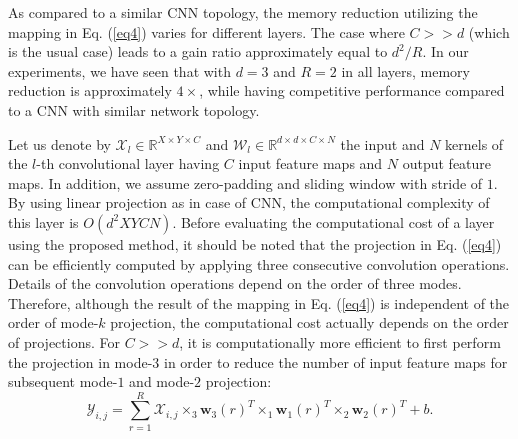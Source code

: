 \documentclass[conference,usletter]{IEEEtran}
\begin{document}
As compared to a similar CNN topology, the memory reduction utilizing the mapping in Eq. (\ref{eq4}) varies for different layers. The case where $C >> d$ (which is the usual case) leads to a gain ratio approximately equal to $d^2/R$. In our experiments, we have seen that with $d=3$ and $R=2$ in all layers, memory reduction is approximately $4\times$, while having competitive performance compared to a CNN with similar network topology.

Let us denote by $\mathcal{X}_l \in \mathbb{R}^{X\times Y\times C}$ and $\mathcal{W}_l \in \mathbb{R}^{d\times d\times C\times N}$ the input and $N$ kernels of the $l$-th convolutional layer having $C$ input feature maps and  $N$ output feature maps. In addition, we assume zero-padding and sliding window with stride of $1$. By using linear projection as in case of CNN, the computational complexity of this layer is $O(d^2XYCN)$. Before evaluating the computational cost of a layer using the proposed method, it should be noted that the projection in Eq. (\ref{eq4}) can be efficiently computed by applying three consecutive convolution operations. Details of the convolution operations depend on the order of three modes. Therefore, although the result of the mapping in Eq. (\ref{eq4}) is independent of the order of mode-$k$ projection, the computational cost actually depends on the order of projections. For $C >> d$, it is computationally more efficient to first perform the projection in mode-$3$ in order to reduce the number of input feature maps for subsequent mode-$1$ and mode-$2$ projection:
\begin{equation}\label{eq6}
\mathcal{Y}_{i,j}=\sum_{r=1}^{R}\mathcal{X}_{i,j}\times_3 \mathbf{w}_{3}(r)^{T}\times_1 \mathbf{w}_{1}(r)^{T}\times_2 \mathbf{w}_{2}(r)^{T} + b.
\end{equation}
\end{document}

